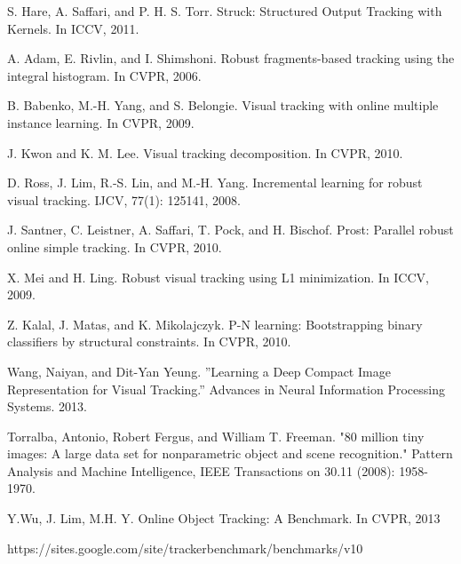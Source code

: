 \documentclass{article}
\begin{document}
\begin{thebibliography}{99}
S. Hare, A. Saffari, and P. H. S. Torr. Struck: Structured Output
Tracking with Kernels. In ICCV, 2011.

A. Adam, E. Rivlin, and I. Shimshoni. Robust fragments-based tracking using the integral histogram. In CVPR, 2006.

B. Babenko, M.-H. Yang, and S. Belongie. Visual tracking with online multiple instance learning. In CVPR, 2009.

J. Kwon and K. M. Lee. Visual tracking decomposition. In CVPR, 2010.

D. Ross, J. Lim, R.-S. Lin, and M.-H. Yang. Incremental learning for robust visual tracking. IJCV, 77(1): 125141, 2008.

J. Santner, C. Leistner, A. Saffari, T. Pock, and H. Bischof. Prost: Parallel robust online simple tracking. In CVPR, 2010.

X. Mei and H. Ling. Robust visual tracking using L1 minimization. In ICCV, 2009.

Z. Kalal, J. Matas, and K. Mikolajczyk. P-N learning: Bootstrapping binary classifiers by structural constraints. In CVPR, 2010.

Wang, Naiyan, and Dit-Yan Yeung. ''Learning a Deep Compact Image Representation for Visual Tracking.'' Advances in Neural Information Processing Systems. 2013.

Torralba, Antonio, Robert Fergus, and William T. Freeman. "80 million tiny images: A large data set for nonparametric object and scene recognition." Pattern Analysis and Machine Intelligence, IEEE Transactions on 30.11 (2008): 1958-1970.

Y.Wu, J. Lim, M.H. Y. Online Object Tracking: A Benchmark. In CVPR, 2013

https://sites.google.com/site/trackerbenchmark/benchmarks/v10

\end{thebibliography}
\end{document}
